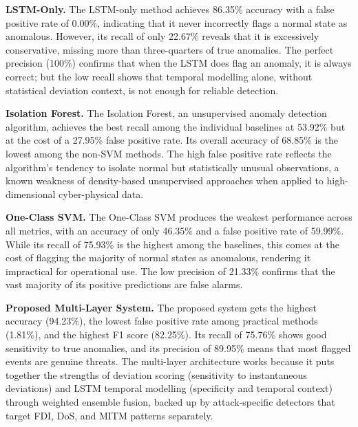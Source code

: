 \noindent
\textbf{LSTM-Only.}
The LSTM-only method achieves 86.35\% accuracy with a false positive rate of 0.00\%, indicating that it never incorrectly flags a normal state as anomalous. However, its recall of only 22.67\% reveals that it is excessively conservative, missing more than three-quarters of true anomalies. The perfect precision (100\%) confirms that when the LSTM does flag an anomaly, it is always correct; but the low recall shows that temporal modelling alone, without statistical deviation context, is not enough for reliable detection.

\par \vspace{0.35cm}

\noindent
\textbf{Isolation Forest.}
The Isolation Forest, an unsupervised anomaly detection algorithm, achieves the best recall among the individual baselines at 53.92\% but at the cost of a 27.95\% false positive rate. Its overall accuracy of 68.85\% is the lowest among the non-SVM methods. The high false positive rate reflects the algorithm's tendency to isolate normal but statistically unusual observations, a known weakness of density-based unsupervised approaches when applied to high-dimensional cyber-physical data.

\par \vspace{0.35cm}

\noindent
\textbf{One-Class SVM.}
The One-Class SVM produces the weakest performance across all metrics, with an accuracy of only 46.35\% and a false positive rate of 59.99\%. While its recall of 75.93\% is the highest among the baselines, this comes at the cost of flagging the majority of normal states as anomalous, rendering it impractical for operational use. The low precision of 21.33\% confirms that the vast majority of its positive predictions are false alarms.

\par \vspace{0.35cm}

\noindent
\textbf{Proposed Multi-Layer System.}
The proposed system gets the highest accuracy (94.23\%), the lowest false positive rate among practical methods (1.81\%), and the highest F1 score (82.25\%). Its recall of 75.76\% shows good sensitivity to true anomalies, and its precision of 89.95\% means that most flagged events are genuine threats. The multi-layer architecture works because it puts together the strengths of deviation scoring (sensitivity to instantaneous deviations) and LSTM temporal modelling (specificity and temporal context) through weighted ensemble fusion, backed up by attack-specific detectors that target FDI, DoS, and MITM patterns separately.

